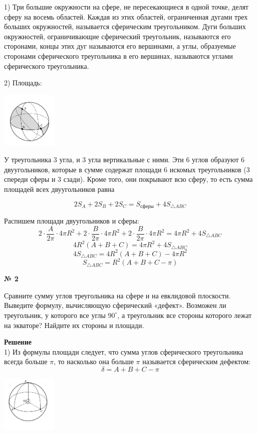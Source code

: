     1) Три большие окружности на сфере, не пересекающиеся в одной
    точке, делят сферу на восемь областей.
    Каждая из этих областей, ограниченная дугами трех больших
    окружностей, называется сферическим треугольником.
    Дуги больших окружностей, ограничивающие сферический треугольник, называются
    его сторонами, концы этих дуг называются его вершинами, а углы, образуемые сторонами сферического треугольника в его вершинах, называются углами сферического треугольника.

    2) Площадь:
    \begin{center}
        \includegraphics[width=0.2\textwidth]{images/Frame 24}\\
    \end{center}

    У треугольника 3 угла, и 3 угла вертикальные с ними.
    Эти 6 углов образуют 6 двуугольников, которые в сумме содержат площади 6 искомых треугольников
    (3 спереди сферы и 3 сзади).
    Кроме того, они покрывают всю сферу, то есть сумма площадей всех двуугольников равна

    \[
        2S_A + 2S_B + 2S_C = S_{\text{сферы}} + 4S_{\triangle ABC}
    \]

    Распишем площади двуугольников и сферы:
    \[
        2 \cdot \frac{A}{2\pi}\cdot 4\pi R^2 + 2 \cdot \frac{B}{2\pi}\cdot 4\pi R^2 + 2 \cdot \frac{B}{2\pi}\cdot 4\pi R^2 =
        4\pi R^2 + 4S_{\triangle ABC}
    \]
    \[
        4R^2(A + B + C) = 4\pi R^2 + 4S_{\triangle ABC}
    \]
    \[
        4S_{\triangle ABC} = 4R^2(A + B + C) - 4\pi R^2
    \]
    \[
        S_{\triangle ABC} = R^2(A + B + C - \pi)
    \]

    \begin{center}
        \textbf{№ 2}
    \end{center}
    Сравните сумму углов треугольника на сфере и на евклидовой плоскости.
    Выведите формулу, вычисляющую сферический «дефект».
    Возможен ли треугольник, у которого все углы $90^\circ$,
    а треугольник все стороны которого лежат на экваторе?
    Найдите их стороны и площади.

    \textbf{Решение}\\

    1) Из формулы площади следует, что сумма углов сферического треугольника всегда больше $\pi$,
    то насколько она больше $\pi$ называется сферическим дефектом:
    \[
        \delta = A + B + C - \pi
    \]
    \begin{center}
        \includegraphics[width=0.2\textwidth]{images/img6}\\
    \end{center}

